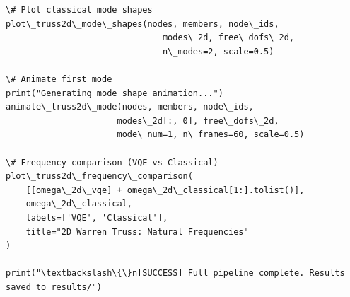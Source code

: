 \documentclass[12pt, a4paper]{article}
\begin{document}
\begin{lstlisting}[style=codestyle, caption={{main.py --- Pipeline Orchestrator}}]
\# Plot classical mode shapes
plot\_truss2d\_mode\_shapes(nodes, members, node\_ids,
                               modes\_2d, free\_dofs\_2d,
                               n\_modes=2, scale=0.5)

\# Animate first mode
print("Generating mode shape animation...")
animate\_truss2d\_mode(nodes, members, node\_ids,
                      modes\_2d[:, 0], free\_dofs\_2d,
                      mode\_num=1, n\_frames=60, scale=0.5)

\# Frequency comparison (VQE vs Classical)
plot\_truss2d\_frequency\_comparison(
    [[omega\_2d\_vqe] + omega\_2d\_classical[1:].tolist()],
    omega\_2d\_classical,
    labels=['VQE', 'Classical'],
    title="2D Warren Truss: Natural Frequencies"
)

print("\textbackslash\{\}n[SUCCESS] Full pipeline complete. Results saved to results/")

\end{lstlisting}

\end{document}
